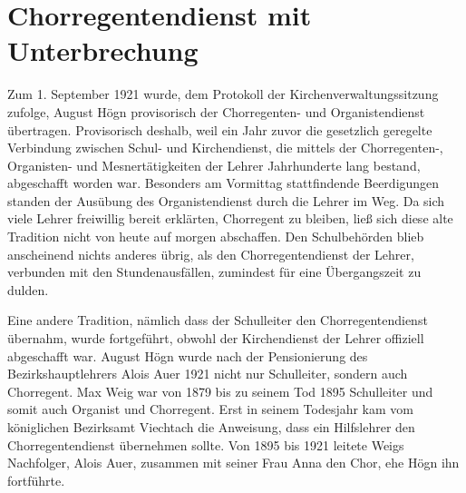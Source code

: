 \section{Chorregentendienst mit Unterbrechung}

Zum 1. September 1921 wurde, dem Protokoll der Kirchenverwaltungssitzung
zufolge, August Högn provisorisch der Chorregenten- und
Organistendienst ü\-ber\-tra\-gen. Provisorisch deshalb, weil ein Jahr zuvor
die gesetzlich geregelte Verbindung zwischen Schul- und Kirchendienst,
die mittels der Chorregenten-, Organisten- und Mesnertätigkeiten der
Lehrer Jahrhunderte lang bestand, abgeschafft worden war. Besonders
am Vormittag stattfindende Beerdigungen standen der Ausübung des
Organistendienst durch die Lehrer im Weg. Da sich viele Lehrer
freiwillig bereit erklärten, Chorregent zu bleiben, ließ sich diese
alte Tradition nicht von heute auf morgen abschaffen. Den Schulbehörden
blieb anscheinend nichts anderes übrig, als den Chorregentendienst
der Lehrer, verbunden mit den Stundenausfällen, zumindest für eine
Übergangszeit zu dulden.

Eine andere Tradition, nämlich dass der Schulleiter den
Chorregentendienst übernahm, wurde fortgeführt, obwohl der
Kirchendienst der Lehrer offiziell abgeschafft war. August Högn wurde
nach der Pensionierung des Bezirkshauptlehrers Alois Auer 1921 nicht
nur Schulleiter, sondern auch Chorregent. Max Weig war von 1879 bis zu
seinem Tod 1895 Schulleiter und somit auch Organist und Chorregent.
Erst in seinem Todesjahr kam vom königlichen Bezirksamt Viechtach die
Anweisung, dass ein Hilfslehrer den Chorregentendienst übernehmen
sollte. Von 1895 bis 1921 leitete Weigs Nachfolger, Alois Auer,
zusammen mit seiner Frau Anna den Chor, ehe Högn ihn fortführte.

